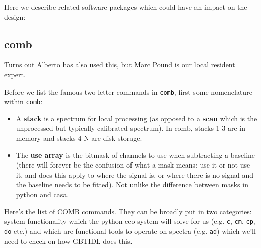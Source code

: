 \documentclass[12pt,a4paper]{article}
\begin{document}
Here we describe related software packages which could have an impact on the design:

\subsection{comb}

Turns out Alberto has also used this, but Marc Pound is our local resident expert.

Before we list the famous two-letter commands in {\tt comb}, first some nomenclature within {\tt comb}:

\begin{itemize}
  
\item A {\bf stack} is a spectrum for local processing (as opposed to a
  {\bf scan} which is the unprocessed but typically calibrated spectrum).
  In comb, stacks 1-3 are in memory and stacks 4-N are disk storage.
  
\item  
  The {\bf use array} is the bitmask of channels to use when subtracting a
  baseline (there will forever be the confusion of what a mask means: use it
  or not use it, and does this apply to where the signal is, or where there
  is no signal and the baseline needs to be fitted). Not unlike the difference
  between masks in python and casa.
  
\end{itemize}

Here's the list of COMB commands.  They can be broadly put in two categories:
system functionality which the python eco-system will solve for us (e.g. {\tt c},
{\tt cm}, {\tt cp}, {\tt do} etc.) and which are functional tools to operate
on spectra (e.g. {\tt ad}) which we'll need to check on how GBTIDL does this.
\end{document}
